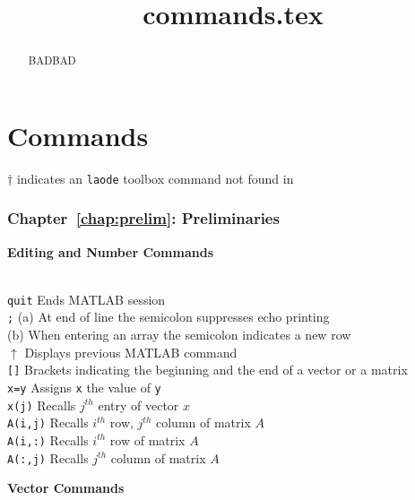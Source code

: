 \documentclass{ximera}
\title{commands.tex}
\begin{document}
\begin{abstract}
BADBAD
\end{abstract}
\maketitle

\chapter*{\protect\Matlab Commands}

{\large $\dagger$ indicates an {\tt laode} toolbox command not found in \Matlab}

\subsection*{Chapter~\ref{chap:prelim}: Preliminaries}

\centerline{
{\bf Editing and Number Commands}
} \vspace*{-0.1in}

\begin{tabbing}
 \hspace{1.1in} \= \\
{\tt quit}   \> Ends MATLAB session\\ 
{\tt ;} \index{\computer!;} \>
   (a) At end of line the semicolon suppresses echo printing\\ 
  \>      (b) When entering an array the semicolon indicates a new row\\
{\tt $\uparrow$} \index{\computer!$\uparrow$} \>
 Displays previous MATLAB command \\
{\tt []} \> Brackets indicating the beginning and the end of a vector or
	a matrix\\
{\tt x=y} \> Assigns {\tt x} the value of {\tt y}\\
{\tt x(j)} \> Recalls $j^{th}$ entry of vector $x$\\
{\tt A(i,j)}  \> Recalls $i^{th}$ row, $j^{th}$ column of matrix $A$\\
{\tt A(i,:)} \>  Recalls $i^{th}$ row of matrix $A$\index{\computer!:}\\
{\tt A(:,j)} \> Recalls $j^{th}$ column of matrix $A$ 
\end{tabbing}



\centerline{
{\bf Vector Commands}
} \vspace*{-0.11in}
 
\end{document}
